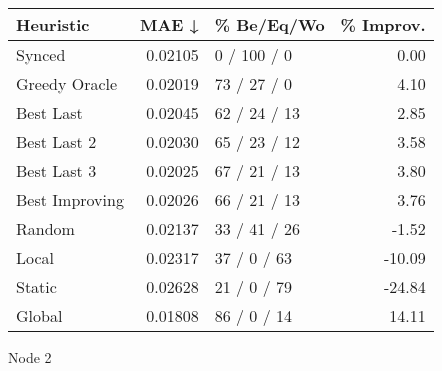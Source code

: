 \begin{tabular}{lrlr}
\toprule
\textbf{Heuristic} & \textbf{MAE ↓} & \textbf{\% Be/Eq/Wo} & \textbf{\% Improv.} \\
\midrule
            Synced &        0.02105 &          0 / 100 / 0 &                0.00 \\
     Greedy Oracle &        0.02019 &          73 / 27 / 0 &                4.10 \\
         Best Last &        0.02045 &         62 / 24 / 13 &                2.85 \\
       Best Last 2 &        0.02030 &         65 / 23 / 12 &                3.58 \\
       Best Last 3 &        0.02025 &         67 / 21 / 13 &                3.80 \\
    Best Improving &        0.02026 &         66 / 21 / 13 &                3.76 \\
            Random &        0.02137 &         33 / 41 / 26 &               -1.52 \\
             Local &        0.02317 &          37 / 0 / 63 &              -10.09 \\
            Static &        0.02628 &          21 / 0 / 79 &              -24.84 \\
            Global &        0.01808 &          86 / 0 / 14 &               14.11 \\
\bottomrule
\end{tabular}
\caption{Node 2}
\label{tab:iid_lr05_le2_bs4_2}
